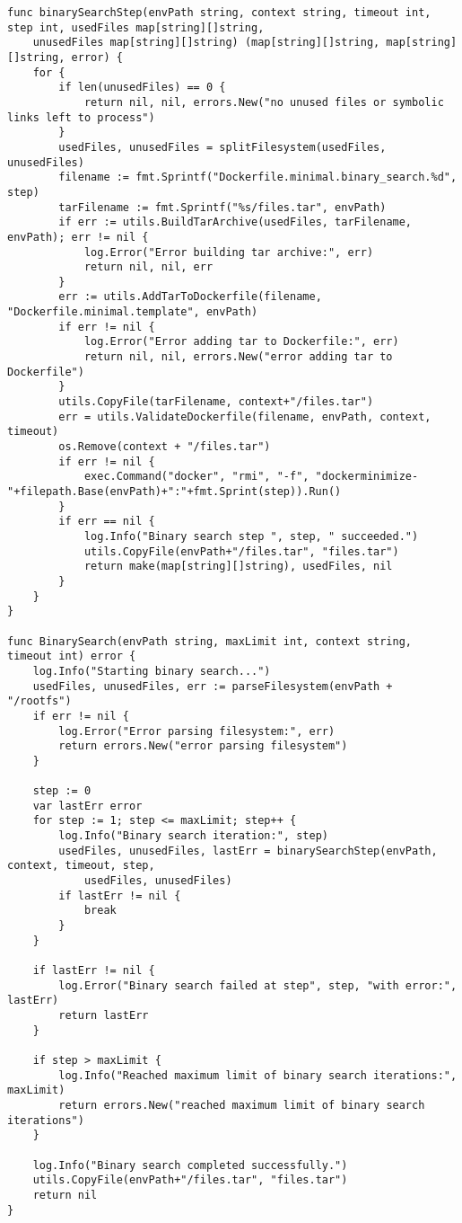 \lstset{language=Go,caption=Binary search function,label=lst:binary-search}
\begin{lstlisting}
func binarySearchStep(envPath string, context string, timeout int, step int, usedFiles map[string][]string,
	unusedFiles map[string][]string) (map[string][]string, map[string][]string, error) {
	for {
		if len(unusedFiles) == 0 {
			return nil, nil, errors.New("no unused files or symbolic links left to process")
		}
		usedFiles, unusedFiles = splitFilesystem(usedFiles, unusedFiles)
		filename := fmt.Sprintf("Dockerfile.minimal.binary_search.%d", step)
		tarFilename := fmt.Sprintf("%s/files.tar", envPath)
		if err := utils.BuildTarArchive(usedFiles, tarFilename, envPath); err != nil {
			log.Error("Error building tar archive:", err)
			return nil, nil, err
		}
		err := utils.AddTarToDockerfile(filename, "Dockerfile.minimal.template", envPath)
		if err != nil {
			log.Error("Error adding tar to Dockerfile:", err)
			return nil, nil, errors.New("error adding tar to Dockerfile")
		}
		utils.CopyFile(tarFilename, context+"/files.tar")
		err = utils.ValidateDockerfile(filename, envPath, context, timeout)
		os.Remove(context + "/files.tar")
		if err != nil {
			exec.Command("docker", "rmi", "-f", "dockerminimize-"+filepath.Base(envPath)+":"+fmt.Sprint(step)).Run()
		}
		if err == nil {
			log.Info("Binary search step ", step, " succeeded.")
			utils.CopyFile(envPath+"/files.tar", "files.tar")
			return make(map[string][]string), usedFiles, nil
		}
	}
}

func BinarySearch(envPath string, maxLimit int, context string, timeout int) error {
	log.Info("Starting binary search...")
	usedFiles, unusedFiles, err := parseFilesystem(envPath + "/rootfs")
	if err != nil {
		log.Error("Error parsing filesystem:", err)
		return errors.New("error parsing filesystem")
	}

	step := 0
	var lastErr error
	for step := 1; step <= maxLimit; step++ {
		log.Info("Binary search iteration:", step)
		usedFiles, unusedFiles, lastErr = binarySearchStep(envPath, context, timeout, step,
			usedFiles, unusedFiles)
		if lastErr != nil {
			break
		}
	}

	if lastErr != nil {
		log.Error("Binary search failed at step", step, "with error:", lastErr)
		return lastErr
	}

	if step > maxLimit {
		log.Info("Reached maximum limit of binary search iterations:", maxLimit)
		return errors.New("reached maximum limit of binary search iterations")
	}

	log.Info("Binary search completed successfully.")
	utils.CopyFile(envPath+"/files.tar", "files.tar")
	return nil
}

\end{lstlisting}

